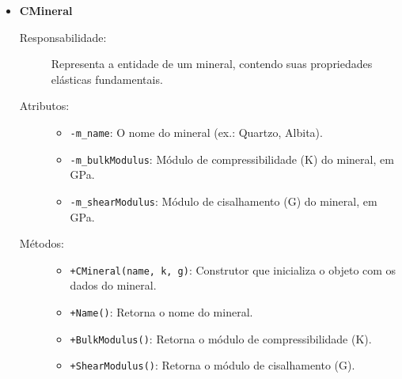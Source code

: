 \begin{itemize}
\begin{description}
        \item[Métodos:]
        \begin{itemize}
            \item \texttt{+CAmostra(...)}: Construtor que inicializa todos os atributos do objeto.
            \item \texttt{+NomeReservatorio()}: Retorna o nome do reservatório.
            \item \texttt{+NomeAmostra()}: Retorna o nome da amostra.
            \item \texttt{+Profundidade()}: Retorna o valor da profundidade.
            \item \texttt{+Porosidade()}: Retorna o valor da porosidade.
            \item \texttt{+Minerais()}: Retorna a coleção de minerais e suas respectivas proporções.
        \end{itemize}
    \end{description}

    \item \textbf{CMineral}
    \begin{description}
        \item[Responsabilidade:] Representa a entidade de um mineral, contendo suas propriedades elásticas fundamentais.
        
        \item[Atributos:] 
        \begin{itemize}
            \item \texttt{-m\_name}: O nome do mineral (ex.: Quartzo, Albita).
            \item \texttt{-m\_bulkModulus}: Módulo de compressibilidade (K) do mineral, em GPa.
            \item \texttt{-m\_shearModulus}: Módulo de cisalhamento (G) do mineral, em GPa.
        \end{itemize}
        
        \item[Métodos:]
        \begin{itemize}
            \item \texttt{+CMineral(name, k, g)}: Construtor que inicializa o objeto com os dados do mineral.
            \item \texttt{+Name()}: Retorna o nome do mineral.
            \item \texttt{+BulkModulus()}: Retorna o módulo de compressibilidade (K).
            \item \texttt{+ShearModulus()}: Retorna o módulo de cisalhamento (G).
        \end{itemize}
    \end{description}


\end{itemize}
